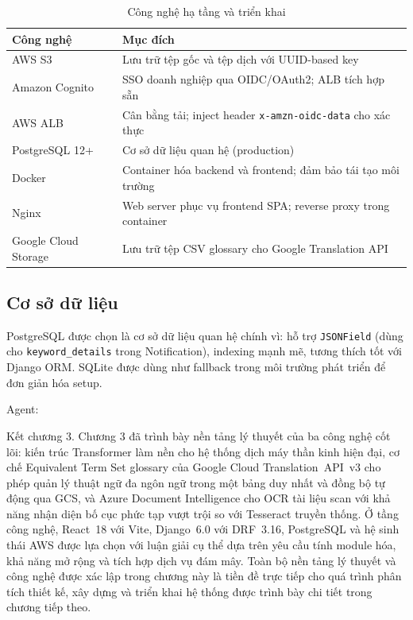 \begin{table}[H]
\centering
\caption{Công nghệ hạ tầng và triển khai}
\label{tab:tech_infra}
\renewcommand{\arraystretch}{1.3}
\begin{tabularx}{\textwidth}{|l|X|}
\hline
\textbf{Công nghệ}         & \textbf{Mục đích} \\
\hline
AWS S3                     & Lưu trữ tệp gốc và tệp dịch với UUID-based key \\
\hline
Amazon Cognito             & SSO doanh nghiệp qua OIDC/OAuth2; ALB tích hợp sẵn \\
\hline
AWS ALB                    & Cân bằng tải; inject header \texttt{x-amzn-oidc-data} cho xác thực \\
\hline
PostgreSQL 12+             & Cơ sở dữ liệu quan hệ (production) \\
\hline
Docker                     & Container hóa backend và frontend; đảm bảo tái tạo môi trường \\
\hline
Nginx                      & Web server phục vụ frontend SPA; reverse proxy trong container \\
\hline
Google Cloud Storage       & Lưu trữ tệp CSV glossary cho Google Translation API \\
\hline
\end{tabularx}
\end{table}

\subsection{Cơ sở dữ liệu}

PostgreSQL được chọn là cơ sở dữ liệu quan hệ chính vì: hỗ trợ \texttt{JSONField} (dùng cho
\texttt{keyword\_details} trong Notification), indexing mạnh mẽ, tương thích tốt với Django ORM.
SQLite được dùng như fallback trong môi trường phát triển để đơn giản hóa setup.

Agent:

Kết chương 3. Chương 3 đã trình bày nền tảng lý thuyết của ba công nghệ cốt lõi: kiến trúc Transformer làm nền cho hệ thống dịch máy thần kinh hiện đại, cơ chế Equivalent Term Set glossary của Google Cloud Translation~API~v3 cho phép quản lý thuật ngữ đa ngôn ngữ trong một bảng duy nhất và đồng bộ tự động qua GCS, và Azure Document Intelligence cho OCR tài liệu scan với khả năng nhận diện bố cục phức tạp vượt trội so với Tesseract truyền thống. Ở tầng công nghệ, React~18 với Vite, Django~6.0 với DRF~3.16, PostgreSQL và hệ sinh thái AWS được lựa chọn với luận giải cụ thể dựa trên yêu cầu tính module hóa, khả năng mở rộng và tích hợp dịch vụ đám mây. Toàn bộ nền tảng lý thuyết và công nghệ được xác lập trong chương này là tiền đề trực tiếp cho quá trình phân tích thiết kế, xây dựng và triển khai hệ thống được trình bày chi tiết trong chương tiếp theo.
